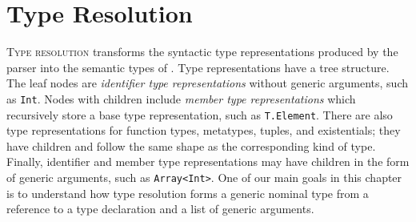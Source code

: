\documentclass[../generics]{subfiles}
\begin{document}
\chapter{Type Resolution}\label{typeresolution}

\lettrine{T}{ype resolution} transforms the syntactic type representations produced by the parser into the semantic types of . Type representations have a tree structure. The leaf nodes are \emph{identifier type representations} without generic arguments, such as \texttt{Int}. Nodes with children include \emph{member type representations} which recursively store a base type representation, such as \texttt{T.Element}. There are also type representations for function types, metatypes, tuples, and existentials; they have children and follow the same shape as the corresponding kind of type. Finally, identifier and member type representations may have children in the form of generic arguments, such as \texttt{Array<Int>}. One of our main goals in this chapter is to understand how type resolution forms a generic nominal type from a reference to a type declaration and a list of generic arguments.
\end{document}
